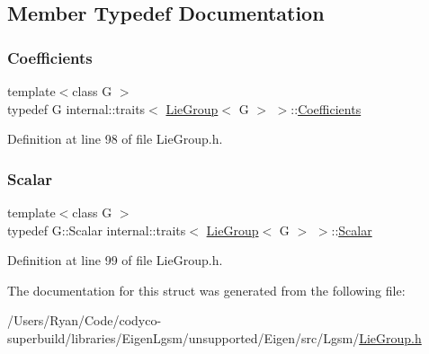 \subsection{Member Typedef Documentation}
\hypertarget{structinternal_1_1traits_3_01_lie_group_3_01_g_01_4_01_4_adfb0de0a4ac03ebf58b0e6d9372e831d}{}\label{structinternal_1_1traits_3_01_lie_group_3_01_g_01_4_01_4_adfb0de0a4ac03ebf58b0e6d9372e831d} 
\subsubsection{\texorpdfstring{Coefficients}{Coefficients}}
{\footnotesize\ttfamily template$<$class G $>$ \\
typedef G internal\+::traits$<$ \hyperlink{class_lie_group}{Lie\+Group}$<$ G $>$ $>$\+::\hyperlink{structinternal_1_1traits_3_01_lie_group_3_01_g_01_4_01_4_adfb0de0a4ac03ebf58b0e6d9372e831d}{Coefficients}}



Definition at line 98 of file Lie\+Group.\+h.

\hypertarget{structinternal_1_1traits_3_01_lie_group_3_01_g_01_4_01_4_ab4c105288bd0027999a766a8ca7ac9c5}{}\label{structinternal_1_1traits_3_01_lie_group_3_01_g_01_4_01_4_ab4c105288bd0027999a766a8ca7ac9c5} 
\subsubsection{\texorpdfstring{Scalar}{Scalar}}
{\footnotesize\ttfamily template$<$class G $>$ \\
typedef G\+::\+Scalar internal\+::traits$<$ \hyperlink{class_lie_group}{Lie\+Group}$<$ G $>$ $>$\+::\hyperlink{structinternal_1_1traits_3_01_lie_group_3_01_g_01_4_01_4_ab4c105288bd0027999a766a8ca7ac9c5}{Scalar}}



Definition at line 99 of file Lie\+Group.\+h.



The documentation for this struct was generated from the following file\+:\begin{DoxyCompactItemize}
\item 
/\+Users/\+Ryan/\+Code/codyco-\/superbuild/libraries/\+Eigen\+Lgsm/unsupported/\+Eigen/src/\+Lgsm/\hyperlink{_lie_group_8h}{Lie\+Group.\+h}\end{DoxyCompactItemize}
